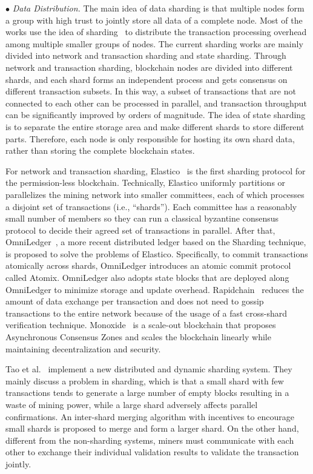 \documentclass[acmsmall]{acmart}
\begin{document}
$\bullet$ {\it Data Distribution.}  
The main idea of data sharding is that multiple nodes form a group with high trust to jointly store all data of a complete node. Most of the works use the idea of sharding~\cite{dang2019towards} to distribute the transaction processing overhead among multiple smaller groups of nodes.
The current sharding works are mainly divided into network and transaction sharding and state sharding. Through network and transaction sharding, blockchain nodes are divided into different shards, and each shard forms an independent process and gets consensus on different transaction subsets. In this way, a subset of transactions that are not connected to each other can be processed in parallel, and transaction throughput can be significantly improved by orders of magnitude. The idea of state sharding is to separate the entire storage area and make different shards to store different parts. Therefore, each node is only responsible for hosting its own shard data, rather than storing the complete blockchain states.



For network and transaction sharding, Elastico~\cite{luu2016secure} is the first sharding protocol for the permission-less blockchain. Technically, Elastico uniformly partitions or parallelizes the mining network into smaller committees, each of which processes a disjoint set of transactions (i.e., “shards”). Each committee has a reasonably small number of members so they can run a classical byzantine consensus protocol to decide their agreed set of transactions in parallel.
After that, OmniLedger~\cite{kokoris2018omniledger}, a more recent distributed ledger based on the Sharding technique, is proposed to solve the problems of Elastico. Specifically, to commit transactions atomically across shards, OmniLedger introduces an atomic commit protocol called Atomix. OmniLedger also adopts state blocks that are deployed along OmniLedger to minimize storage and update overhead.
Rapidchain~\cite{zamani2018rapidchain} reduces the amount of data exchange per transaction and does not need to gossip transactions to the entire network because of the usage of a fast cross-shard verification technique. Monoxide~\cite{wang2019monoxide} is a scale-out blockchain that proposes Asynchronous Consensus Zones and scales the blockchain linearly while maintaining decentralization and security.


Tao et al.~\cite{DBLP:conf/icde/TaoLJNWL20} implement a new distributed and dynamic sharding system. They mainly discuss a problem in sharding, which is that a small shard with few transactions tends to generate a large number of empty blocks resulting in a waste of mining power, while a large shard adversely affects parallel confirmations. An inter-shard merging algorithm with incentives to encourage small shards is proposed to merge and form a larger shard. On the other hand, different from the non-sharding systems, miners must communicate with each other to exchange their individual validation results to validate the transaction jointly.
\end{document}

